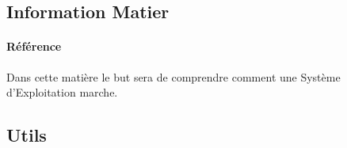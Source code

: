 \documentclass{article}
\begin{document}







\subsection{Information Matier}
\paragraph{Référence}Dans cette matière le but sera de comprendre comment une Système d'Exploitation marche.

\subsection{Utils}

\end{document}
